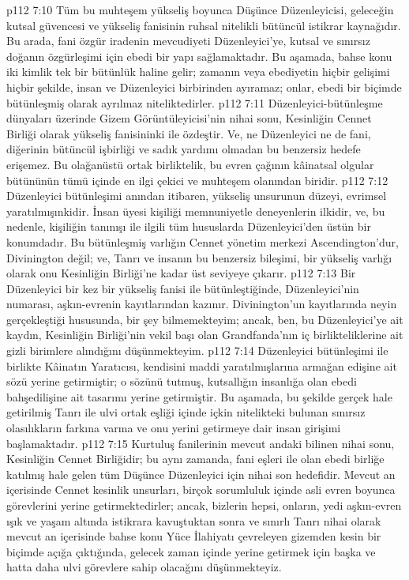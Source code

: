 \vs p112 7:10 Tüm bu muhteşem yükseliş boyunca Düşünce Düzenleyicisi, geleceğin kutsal güvencesi ve yükseliş fanisinin ruhsal nitelikli bütüncül istikrar kaynağıdır. Bu arada, fani özgür iradenin mevcudiyeti Düzenleyici’ye, kutsal ve sınırsız doğanın özgürleşimi için ebedi bir yapı sağlamaktadır. Bu aşamada, bahse konu iki kimlik tek bir bütünlük haline gelir; zamanın veya ebediyetin hiçbir gelişimi hiçbir şekilde, insan ve Düzenleyici birbirinden ayıramaz; onlar, ebedi bir biçimde bütünleşmiş olarak ayrılmaz niteliktedirler.
\vs p112 7:11 Düzenleyici\hyp{}bütünleşme dünyaları üzerinde Gizem Görüntüleyicisi’nin nihai sonu, Kesinliğin Cennet Birliği olarak yükseliş fanisininki ile özdeştir. Ve, ne Düzenleyici ne de fani, diğerinin bütüncül işbirliği ve sadık yardımı olmadan bu benzersiz hedefe erişemez. Bu olağanüstü ortak birliktelik, bu evren çağının kâinatsal olgular bütününün tümü içinde en ilgi çekici ve muhteşem olanından biridir.
\vs p112 7:12 Düzenleyici bütünleşimi anından itibaren, yükseliş unsurunun düzeyi, evrimsel yaratılmışınkidir. İnsan üyesi kişiliği memnuniyetle deneyenlerin ilkidir, ve, bu nedenle, kişiliğin tanınışı ile ilgili tüm hususlarda Düzenleyici’den üstün bir konumdadır. Bu bütünleşmiş varlığın Cennet yönetim merkezi Ascendington’dur, Divinington değil; ve, Tanrı ve insanın bu benzersiz bileşimi, bir yükseliş varlığı olarak onu Kesinliğin Birliği’ne kadar üst seviyeye çıkarır.
\vs p112 7:13 Bir Düzenleyici bir kez bir yükseliş fanisi ile bütünleştiğinde, Düzenleyici’nin numarası, aşkın\hyp{}evrenin kayıtlarından kazınır. Divinington’un kayıtlarında neyin gerçekleştiği hususunda, bir şey bilmemekteyim; ancak, ben, bu Düzenleyici’ye ait kaydın, Kesinliğin Birliği’nin vekil başı olan Grandfanda’nın iç birlikteliklerine ait gizli birimlere alındığını düşünmekteyim.
\vs p112 7:14 Düzenleyici bütünleşimi ile birlikte Kâinatın Yaratıcısı, kendisini maddi yaratılmışlarına armağan edişine ait sözü yerine getirmiştir; o sözünü tutmuş, kutsallığın insanlığa olan ebedi bahşedilişine ait tasarımı yerine getirmiştir. Bu aşamada, bu şekilde gerçek hale getirilmiş Tanrı ile ulvi ortak eşliği içinde içkin nitelikteki bulunan sınırsız olasılıkların farkına varma ve onu yerini getirmeye dair insan girişimi başlamaktadır.
\vs p112 7:15 Kurtuluş fanilerinin mevcut andaki bilinen nihai sonu, Kesinliğin Cennet Birliğidir; bu aynı zamanda, fani eşleri ile olan ebedi birliğe katılmış hale gelen tüm Düşünce Düzenleyici için nihai son hedefidir. Mevcut an içerisinde Cennet kesinlik unsurları, birçok sorumluluk içinde asli evren boyunca görevlerini yerine getirmektedirler; ancak, bizlerin hepsi, onların, yedi aşkın\hyp{}evren ışık ve yaşam altında istikrara kavuştuktan sonra ve sınırlı Tanrı nihai olarak mevcut an içerisinde bahse konu Yüce İlahiyatı çevreleyen gizemden kesin bir biçimde açığa çıktığında, gelecek zaman içinde yerine getirmek için başka ve hatta daha ulvi görevlere sahip olacağını düşünmekteyiz.
